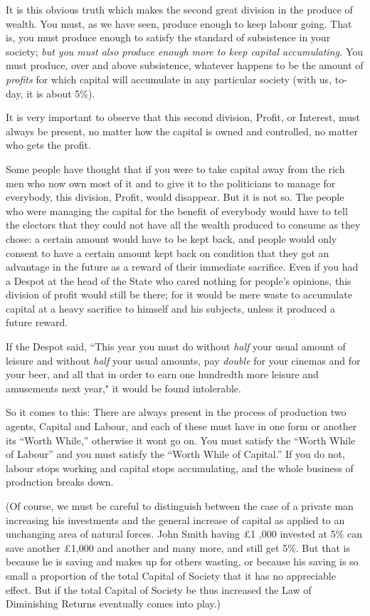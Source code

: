 \documentclass{book}
\begin{document}
It is this obvious truth which makes the second great division in the produce of wealth. You must, as we have seen, produce enough to keep labour going. That is, you must produce enough to satisfy the standard of subsistence in your society; \emph{but you must also produce enough more to keep capital accumulating.} You must produce, over and above subsistence, whatever happens to be the amount of \emph{profits} for which capital will accumulate in any particular society (with us, to-day, it is about 5\%).

It is very important to observe that this second division, Profit, or Interest, must always be present, no matter how the capital is owned and controlled, no matter who gets the profit.

Some people have thought that if you were to take capital away from the rich men who now own most of it and to give it to the politicians to manage for everybody, this division, Profit, would disappear. But it is not so. The people who were managing the capital for the benefit of everybody would have to tell the electors that they could not have all the wealth produced to consume as they chose: a certain amount would have to be kept back, and people would only consent to have a certain amount kept back on condition that they got an advantage in the future as a reward of their immediate sacrifice. Even if you had a Despot at the head of the State who cared nothing for people’s opinions, this division of profit would still be there; for it would be mere waste to accumulate capital at a heavy sacrifice to himself and his subjects, unless it produced a future reward.

If the Despot said, “This year you must do without \emph{half} your usual amount of leisure and without \emph{half} your usual amounts, pay \emph{double} for your cinemas and for your beer, and all that in order to earn one hundredth more leisure and amusements next year," it would be found intolerable.

So it comes to this: There are always present in the process of production two agents, Capital and Labour, and each of these must have in one form or another its “Worth While,” otherwise it wont go on. You must satisfy the “Worth While of Labour” and you must satisfy the “Worth While of Capital.” If you do not, labour stops working and capital stops accumulating, and the whole business of production breaks down.

(Of course, we must be careful to distinguish between the case of a private man increasing his investments and the general increase of capital as applied to an unchanging area of natural forces. John Smith having £1 ,000 invested at 5\% can save another £1,000 and another and many more, and still get 5\%. But that is because he is saving and makes up for others wasting, or because his saving is so small a proportion of the total Capital of Society that it has no appreciable effect. But if the total Capital of Society be thus increased the Law of Diminishing Returns eventually comes into play.)
\end{document}
